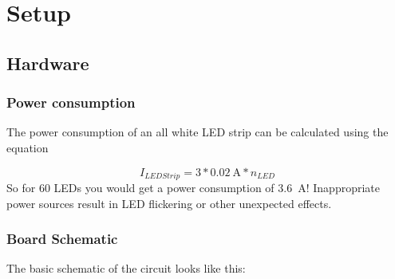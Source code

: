 \documentclass[10pt,a4paper]{article}
\begin{document}
\section{Setup}
\subsection{Hardware}

\subsubsection{Power consumption}

The power consumption of an all white LED strip can be calculated using the equation

\begin{equation}
	I_{LED Strip} = 3 * \SI{0.02}{\ampere} * n_{LED}
\end{equation}
So for 60 LEDs you would get a power consumption of \SI{3.6}{\ampere}! Inappropriate power sources result in LED flickering or other unexpected effects. 

\subsubsection{Board Schematic}

The basic schematic of the circuit looks like this:
\end{document}
